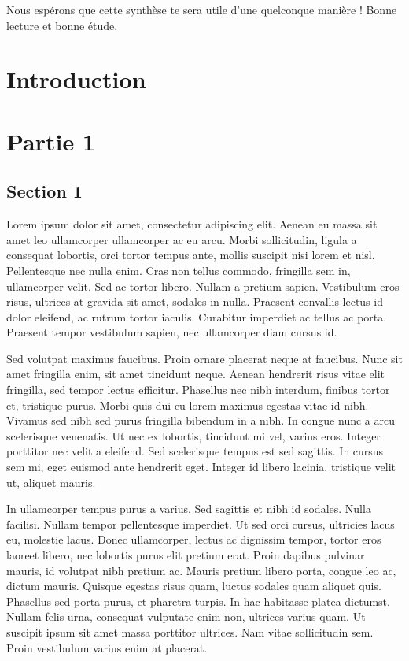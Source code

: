 \documentclass{report}
\begin{document}
Nous espérons que cette synthèse te sera utile d'une quelconque manière ! Bonne lecture et bonne étude.

\chapter{Introduction}

\chapter{Partie 1}
\section{Section 1}
Lorem ipsum dolor sit amet, consectetur adipiscing elit. Aenean eu massa sit amet leo ullamcorper ullamcorper ac eu arcu. Morbi sollicitudin, ligula a consequat lobortis, orci tortor tempus ante, mollis suscipit nisi lorem et nisl. Pellentesque nec nulla enim. Cras non tellus commodo, fringilla sem in, ullamcorper velit. Sed ac tortor libero. Nullam a pretium sapien. Vestibulum eros risus, ultrices at gravida sit amet, sodales in nulla. Praesent convallis lectus id dolor eleifend, ac rutrum tortor iaculis. Curabitur imperdiet ac tellus ac porta. Praesent tempor vestibulum sapien, nec ullamcorper diam cursus id.

Sed volutpat maximus faucibus. Proin ornare placerat neque at faucibus. Nunc sit amet fringilla enim, sit amet tincidunt neque. Aenean hendrerit risus vitae elit fringilla, sed tempor lectus efficitur. Phasellus nec nibh interdum, finibus tortor et, tristique purus. Morbi quis dui eu lorem maximus egestas vitae id nibh. Vivamus sed nibh sed purus fringilla bibendum in a nibh. In congue nunc a arcu scelerisque venenatis. Ut nec ex lobortis, tincidunt mi vel, varius eros. Integer porttitor nec velit a eleifend. Sed scelerisque tempus est sed sagittis. In cursus sem mi, eget euismod ante hendrerit eget. Integer id libero lacinia, tristique velit ut, aliquet mauris.

In ullamcorper tempus purus a varius. Sed sagittis et nibh id sodales. Nulla facilisi. Nullam tempor pellentesque imperdiet. Ut sed orci cursus, ultricies lacus eu, molestie lacus. Donec ullamcorper, lectus ac dignissim tempor, tortor eros laoreet libero, nec lobortis purus elit pretium erat. Proin dapibus pulvinar mauris, id volutpat nibh pretium ac. Mauris pretium libero porta, congue leo ac, dictum mauris. Quisque egestas risus quam, luctus sodales quam aliquet quis. Phasellus sed porta purus, et pharetra turpis. In hac habitasse platea dictumst. Nullam felis urna, consequat vulputate enim non, ultrices varius quam. Ut suscipit ipsum sit amet massa porttitor ultrices. Nam vitae sollicitudin sem. Proin vestibulum varius enim at placerat.
\end{document}
